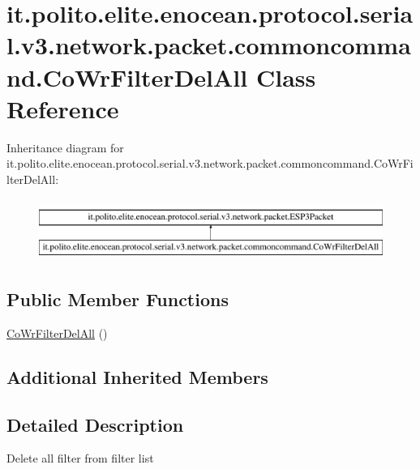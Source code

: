 \hypertarget{classit_1_1polito_1_1elite_1_1enocean_1_1protocol_1_1serial_1_1v3_1_1network_1_1packet_1_1common388b9388c32720652fa6fbd608c9c62c}{}\section{it.\+polito.\+elite.\+enocean.\+protocol.\+serial.\+v3.\+network.\+packet.\+commoncommand.\+Co\+Wr\+Filter\+Del\+All Class Reference}
\label{classit_1_1polito_1_1elite_1_1enocean_1_1protocol_1_1serial_1_1v3_1_1network_1_1packet_1_1common388b9388c32720652fa6fbd608c9c62c}
Inheritance diagram for it.\+polito.\+elite.\+enocean.\+protocol.\+serial.\+v3.\+network.\+packet.\+commoncommand.\+Co\+Wr\+Filter\+Del\+All\+:\begin{figure}[H]
\begin{center}
\leavevmode
\includegraphics[height=2.000000cm]{classit_1_1polito_1_1elite_1_1enocean_1_1protocol_1_1serial_1_1v3_1_1network_1_1packet_1_1common388b9388c32720652fa6fbd608c9c62c}
\end{center}
\end{figure}
\subsection*{Public Member Functions}
\begin{DoxyCompactItemize}
\item 
\hyperlink{classit_1_1polito_1_1elite_1_1enocean_1_1protocol_1_1serial_1_1v3_1_1network_1_1packet_1_1common388b9388c32720652fa6fbd608c9c62c_af22f811d0aead02eb7d2653d2ec00dd4}{Co\+Wr\+Filter\+Del\+All} ()
\end{DoxyCompactItemize}
\subsection*{Additional Inherited Members}


\subsection{Detailed Description}
Delete all filter from filter list

